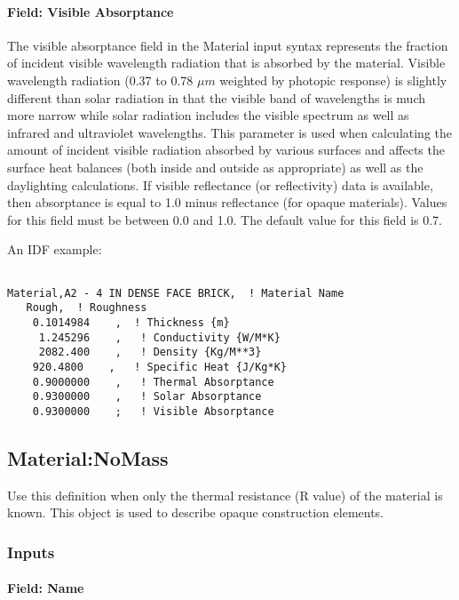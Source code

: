 \paragraph{Field: Visible Absorptance}\label{field-visible-absorptance}

The visible absorptance field in the Material input syntax represents the fraction of incident visible wavelength radiation that is absorbed by the material. Visible wavelength radiation (0.37 to 0.78 $\mu{}m$ weighted by photopic response) is slightly different than solar radiation in that the visible band of wavelengths is much more narrow while solar radiation includes the visible spectrum as well as infrared and ultraviolet wavelengths. This parameter is used when calculating the amount of incident visible radiation absorbed by various surfaces and affects the surface heat balances (both inside and outside as appropriate) as well as the daylighting calculations. If visible reflectance (or reflectivity) data is available, then absorptance is equal to 1.0 minus reflectance (for opaque materials). Values for this field must be between 0.0 and 1.0. The default value for this field is 0.7.

An IDF example:

\begin{lstlisting}

Material,A2 - 4 IN DENSE FACE BRICK,  ! Material Name
   Rough,  ! Roughness
    0.1014984    ,  ! Thickness {m}
     1.245296    ,   ! Conductivity {W/M*K}
     2082.400    ,   ! Density {Kg/M**3}
    920.4800    ,   ! Specific Heat {J/Kg*K}
    0.9000000    ,   ! Thermal Absorptance
    0.9300000    ,   ! Solar Absorptance
    0.9300000    ;   ! Visible Absorptance
\end{lstlisting}

\subsection{Material:NoMass}\label{materialnomass}

Use this definition when only the thermal resistance (R value) of the material is known. This object is used to describe opaque construction elements.

\subsubsection{Inputs}\label{inputs-1-043}

\paragraph{Field: Name}\label{field-name-1-042}

